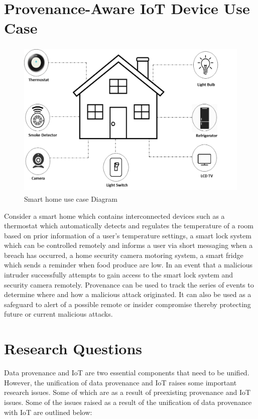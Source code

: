 \section{Provenance-Aware IoT Device Use Case}

\begin{figure}[h]
\begin{center}
\includegraphics[height=3in]{smart_h.png}
\end{center}
\caption{Smart home use case Diagram}
\end{figure}


Consider a smart home which contains interconnected devices such as a thermostat which automatically detects and regulates the temperature of a room based on prior information of a user's temperature settings, a smart lock system which can be controlled remotely and informs a user via short messaging when a breach has occurred, a home security camera motoring system, a smart fridge which sends a reminder when food produce are low. In an event that a malicious intruder successfully attempts  to gain access to the smart lock system and security camera remotely. Provenance can be used to track the series  of events to determine where and how a malicious attack originated. It can also be used as a safeguard to alert of a possible remote or insider compromise thereby protecting future or current malicious attacks. 





\section{Research Questions}
Data provenance and IoT are two essential components that need to be unified. However, the unification of data provenance and IoT raises some important research issues. Some of which are as a result of preexisting provenance and IoT issues. Some of the issues raised as a result of the unification of data provenance with IoT are outlined below:

